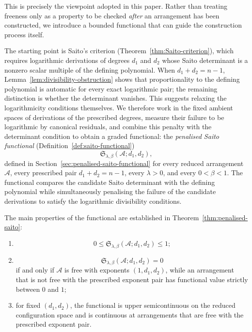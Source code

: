 \documentclass[pdflatex,sn-mathphys-num]{sn-jnl}%
\theoremstyle{remark}
\theoremstyle{definition}
\begin{document}
This is precisely the viewpoint adopted in this paper. Rather than treating freeness only as a property to be checked \emph{after} an arrangement has been constructed, we introduce a bounded functional that can guide the
construction process itself.

The starting point is Saito's criterion
(Theorem~\ref{thm:Saito-criterion}), which requires logarithmic derivations of degrees $d_1$ and $d_2$ whose Saito determinant is a nonzero scalar multiple of the defining polynomial. When $d_1+d_2=n-1$, Lemma~\ref{lem:divisibility-obstruction} shows that proportionality to the defining polynomial is automatic for every exact logarithmic pair; the remaining distinction is whether the determinant vanishes. This suggests relaxing the logarithmicity conditions themselves. We therefore work in the fixed ambient spaces of derivations of the prescribed degrees, measure their failure to be logarithmic by canonical residuals, and combine this penalty with the determinant condition to obtain a graded functional: the \emph{penalised Saito functional} (Definition~\ref{def:saito-functional})
\[
\mathfrak S_{\lambda,\beta}(\mathcal{A};d_1,d_2),
\]
defined in Section~\ref{sec:penalised-saito-functional} for every reduced arrangement $\mathcal{A}$, every prescribed pair $d_1+d_2=n-1$, every $\lambda>0$, and every $0<\beta<1$. The functional compares the candidate Saito determinant with the defining polynomial while simultaneously penalising the failure of the candidate derivations to satisfy
the logarithmic divisibility conditions.

The main properties of the functional are established in Theorem~\ref{thm:penalised-saito}:

\begin{enumerate}
  \item[\textup{(i)}]
  \[
  0\leq
  \mathfrak S_{\lambda,\beta}(\mathcal{A};d_1,d_2)
  \leq1;
  \]

  \item[\textup{(ii)}]
  \[
  \mathfrak S_{\lambda,\beta}(\mathcal{A};d_1,d_2)=0
  \]
  if and only if $\mathcal{A}$ is free with exponents
  $(1,d_1,d_2)$, while an arrangement that is not free with the
  prescribed exponent pair has functional value strictly between $0$
  and $1$;

  \item[\textup{(iii)}]
  for fixed $(d_1,d_2)$, the functional is upper semicontinuous on the
  reduced configuration space and is continuous at arrangements that are
  free with the prescribed exponent pair.
\end{enumerate}
\end{document}
